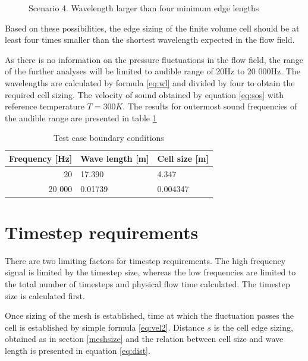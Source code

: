 \begin{figure}[h!]
\centering %
\caption{Scenario 4. Wavelength larger than four minimum edge lengths}
\label{scen4}
\end{figure}

Based on these possibilities, the edge sizing of the finite volume cell should be at least four times smaller than the shortest wavelength expected in the flow field.

As there is no information on the pressure fluctuations in the flow field, the range of the further analyses will be limited to audible range of 20Hz to 20 000Hz. The wavelengths are calculated by formula \ref{eq:wl} and divided by four to obtain the required cell sizing. The velocity of sound obtained by equation \ref{eq:sos} with reference temperature $T = 300K$. The results for outermost sound frequencies of the audible range are presented in table \ref{tab:meshsize}

\begin{table}[htb!]
\centering
\caption{Test case boundary conditions} \label{tab:meshsize}
\begin{tabular}{ | r | l | l | } \hline
Frequency [Hz] & Wave length [m] & Cell size [m] \\ \hline \hline
20 & 17.390 & 4.347  \\ \hline
20 000 & 0.01739 & 0.004347 \\ \hline
\end{tabular}
\end{table}

\section{Timestep requirements} \label{timestepsize}
There are two limiting factors for timestep requirements. The high frequency signal is limited by the timestep size, whereas the low frequencies are limited to the total number of timesteps and physical flow time calculated. The timestep size is calculated first.

Once sizing of the mesh is established, time at which the fluctuation passes the cell is established by simple formula \ref{eq:vel2}. Distance $s$ is the cell edge sizing, obtained as in section \ref{meshsize} and the relation between cell size and wave length is presented in equation \ref{eq:dist}.

